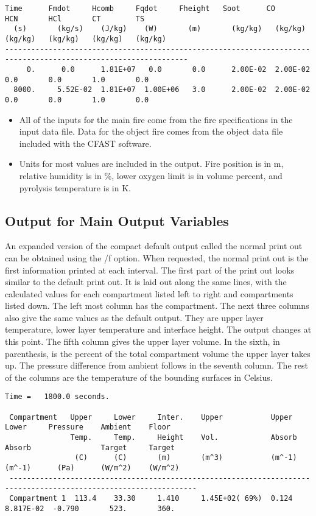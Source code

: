 \begin{lstlisting}[basicstyle=\tiny]
  Time      Fmdot     Hcomb     Fqdot     Fheight   Soot      CO        HCN       HCl       CT        TS
  (s)       (kg/s)    (J/kg)    (W)       (m)       (kg/kg)   (kg/kg)   (kg/kg)   (kg/kg)   (kg/kg)   (kg/kg)
----------------------------------------------------------------------------------------------------------------
     0.      0.0      1.81E+07   0.0       0.0      2.00E-02  2.00E-02   0.0       0.0       1.0       0.0
  8000.     5.52E-02  1.81E+07  1.00E+06   3.0      2.00E-02  2.00E-02   0.0       0.0       1.0       0.0
\end{lstlisting}

\begin{itemize}
\item All of the inputs for the main fire come from the fire specifications in the input data file. Data for the object fire comes from the object data file included with the CFAST software.
\item Units for most values are included in the output.  Fire position is in m, relative humidity is in \%, lower oxygen limit is in volume percent, and pyrolysis temperature is in K.
\end{itemize}

\subsection{Output for Main Output Variables}

An expanded version of the compact default output called the normal print out can be obtained using the /f option.  When requested, the normal print out is the first information printed at each interval.  The first part of the print out looks similar to the default print out.  It is laid out along the same lines, with the calculated values for each compartment listed left to right and compartments listed down.  The left most column has the compartment.  The next three columns also give the same values as the default output.  They are upper layer temperature, lower layer temperature and interface height.  The output changes at this point. The fifth column gives the upper layer volume.  In the sixth, in parenthesis, is the percent of the total compartment volume the upper layer takes up.  The pressure difference from ambient follows in the seventh column.  The rest of the columns are the temperature of the bounding surfaces in Celsius.

\begin{lstlisting}[basicstyle=\tiny]
 Time =   1800.0 seconds.

 Compartment   Upper     Lower     Inter.    Upper           Upper      Lower     Pressure    Ambient    Floor
               Temp.     Temp.     Height    Vol.            Absorb     Absorb                Target     Target
                (C)      (C)       (m)       (m^3)           (m^-1)     (m^-1)      (Pa)      (W/m^2)    (W/m^2)
 -----------------------------------------------------------------------------------------------------------------
 Compartment 1  113.4    33.30     1.410     1.45E+02( 69%)  0.124      8.817E-02  -0.790       523.       360.   
\end{lstlisting}

